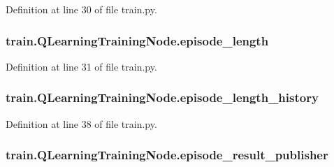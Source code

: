 Definition at line 30 of file train.\+py.

\subsubsection[{\texorpdfstring{episode\+\_\+length}{episode_length}}]{\setlength{\rightskip}{0pt plus 5cm}train.\+Q\+Learning\+Training\+Node.\+episode\+\_\+length}\hypertarget{classtrain_1_1_q_learning_training_node_abaa1cd9793d6724977d7b9451e36bc3b}{}\label{classtrain_1_1_q_learning_training_node_abaa1cd9793d6724977d7b9451e36bc3b}


Definition at line 31 of file train.\+py.

\subsubsection[{\texorpdfstring{episode\+\_\+length\+\_\+history}{episode_length_history}}]{\setlength{\rightskip}{0pt plus 5cm}train.\+Q\+Learning\+Training\+Node.\+episode\+\_\+length\+\_\+history}\hypertarget{classtrain_1_1_q_learning_training_node_af81cfd1d0306828d0ff901faf85df6b3}{}\label{classtrain_1_1_q_learning_training_node_af81cfd1d0306828d0ff901faf85df6b3}


Definition at line 38 of file train.\+py.

\subsubsection[{\texorpdfstring{episode\+\_\+result\+\_\+publisher}{episode_result_publisher}}]{\setlength{\rightskip}{0pt plus 5cm}train.\+Q\+Learning\+Training\+Node.\+episode\+\_\+result\+\_\+publisher}\hypertarget{classtrain_1_1_q_learning_training_node_a7fef779ba6b1592b9ed2837abe5ae6ae}{}\label{classtrain_1_1_q_learning_training_node_a7fef779ba6b1592b9ed2837abe5ae6ae}


